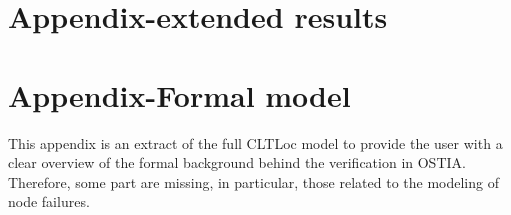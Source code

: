 \onecolumn
% 
%
%
%
%
%


\section{Appendix-extended results}\label{app:extended-exp-results}

\section{Appendix-Formal model}\label{app:extended-formal-model}

This appendix is an extract of the full CLTLoc model to provide the user with a clear overview of the formal background behind the verification in OSTIA.
Therefore, some part are missing, in particular, those related to the modeling of node failures.

